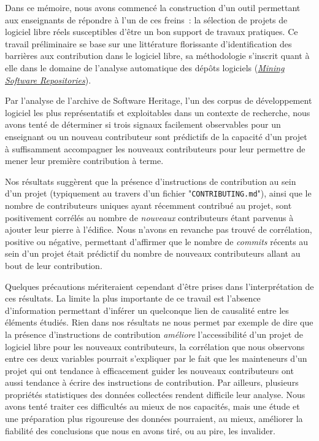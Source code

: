 \documentclass[dvipsnames]{llncs}
\newcommand{\en}[1]{\foreignlanguage{english}{\emph{#1}}}
\begin{document}
    Dans ce mémoire, nous avons commencé la construction d'un outil permettant aux enseignants de répondre à
    l'un de ces freins : la sélection de projets de logiciel libre réels susceptibles d'être un bon support de
    travaux pratiques. Ce travail préliminaire se base sur une littérature florissante d'identification des
    barrières aux contribution dans le logiciel libre, sa méthodologie s'inscrit quant à elle dans le domaine
    de l'analyse automatique des dépôts logiciels (\href{https://conf.researchr.org/series/msr}{\en{Mining
    Software Repositories}}).

    Par l'analyse de l'archive de Software Heritage, l'un des corpus de développement logiciel les plus
    représentatifs et exploitables dans un contexte de recherche, nous avons tenté de déterminer si trois
    signaux facilement observables pour un enseignant ou un nouveau contributeur sont prédictifs de la
    capacité d'un projet à suffisamment accompagner les nouveaux contributeurs pour leur permettre de mener
    leur première contribution à terme.

    Nos résultats suggèrent que la présence d'instructions de contribution au sein d'un projet (typiquement au
    travers d'un fichier "\texttt{CONTRIBUTING.md}"), ainsi que le nombre de contributeurs uniques ayant
    récemment contribué au projet, sont positivement corrélés au nombre de \emph{nouveaux} contributeurs étant
    parvenus à ajouter leur pierre à l'édifice. Nous n'avons en revanche pas trouvé de corrélation, positive
    ou négative, permettant d'affirmer que le nombre de \en{commits} récents au sein d'un projet était
    prédictif du nombre de nouveaux contributeurs allant au bout de leur contribution.

    Quelques précautions mériteraient cependant d'être prises dans l'interprétation de ces résultats. La
    limite la plus importante de ce travail est l'absence d'information permettant d'inférer un quelconque
    lien de causalité entre les éléments étudiés. Rien dans nos résultats ne nous permet par exemple de dire
    que la présence d'instructions de contribution \emph{améliore} l'accessibilité d'un projet de logiciel
    libre pour les nouveaux contributeurs, la corrélation que nous observons entre ces deux variables pourrait
    s'expliquer par le fait que les mainteneurs d'un projet qui ont tendance à efficacement guider les
    nouveaux contributeurs ont aussi tendance à écrire des instructions de contribution. Par ailleurs,
    plusieurs propriétés statistiques des données collectées rendent difficile leur analyse. Nous avons tenté
    traiter ces difficultés au mieux de nos capacités, mais une étude et une préparation plus rigoureuse des
    données pourraient, au mieux, améliorer la fiabilité des conclusions que nous en avons tiré, ou au pire,
    les invalider.
\end{document}

